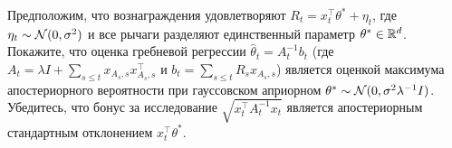 \begin{exercise}
\label{ex:linucb}
Предположим, что вознаграждения удовлетворяют $R_t = x_t^\top\theta^* + \eta_t$, где $\eta_t\sim\mathcal{N}(0,\sigma^2)$ и все рычаги разделяют единственный параметр $\theta^*\in\mathbb{R}^d$.  Покажите, что оценка гребневой регрессии $\hat\theta_t = A_t^{-1}b_t$ (где $A_t=\lambda I + \sum_{s\le t}x_{A_s,s}x_{A_s,s}^\top$ и $b_t=\sum_{s\le t}R_s x_{A_s,s}$) является оценкой максимума апостериорного вероятности при гауссовском априорном $\theta^*\sim\mathcal{N}(0,\sigma^2\lambda^{-1}I)$.  Убедитесь, что бонус за исследование $\sqrt{x_t^\top A_t^{-1}x_t}$ является апостериорным стандартным отклонением $x_t^\top\theta^*$.
\end{exercise}
